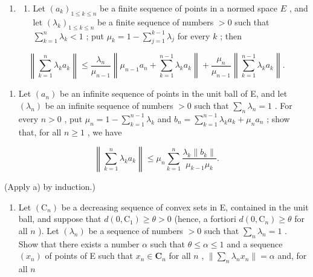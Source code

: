\begin{enumerate}
\def\labelenumi{\arabic{enumi})}
\setcounter{enumi}{23}
\tightlist
\item
  \begin{enumerate}
  \def\labelenumii{\alph{enumii})}
  \tightlist
  \item
    Let \((a_{k})_{1\leqslant k\leqslant n}\) be a finite sequence of points in a normed space \(E\) , and let \((\lambda_k)_{1\leqslant k\leqslant n}\) be a finite sequence of numbers \(>0\) such that \(\sum_{k = 1}^{n}\lambda_{k} < 1\) ; put \(\mu_{k} = 1 - \sum_{j = 1}^{k - 1}\lambda_{j}\) for every \(k\) ; then
  \end{enumerate}
\end{enumerate}

\[
\left\| \sum_ {k = 1} ^ {n} \lambda_ {k} a _ {k} \right\| \leqslant \frac {\lambda_ {n}}{\mu_ {n - 1}} \left\| \mu_ {n - 1} a _ {n} + \sum_ {k = 1} ^ {n - 1} \lambda_ {k} a _ {k} \right\| + \frac {\mu_ {n}}{\mu_ {n - 1}} \left\| \sum_ {k = 1} ^ {n - 1} \lambda_ {k} a _ {k} \right\|.
\]

\begin{enumerate}
\def\labelenumi{\alph{enumi})}
\setcounter{enumi}{1}
\tightlist
\item
  Let \((a_{n})\) be an infinite sequence of points in the unit ball of E, and let \((\lambda_{n})\) be an infinite sequence of numbers \(>0\) such that \(\sum_{n} \lambda_{n} = 1\) . For every \(n > 0\) , put \(\mu_{n} = 1 - \sum_{k=1}^{n-1} \lambda_{k}\) and \(b_{n} = \sum_{k=1}^{n-1} \lambda_{k} a_{k} + \mu_{n} a_{n}\) ; show that, for all \(n \geqslant 1\) , we have
\end{enumerate}

\[
\left\| \sum_ {k = 1} ^ {n} \lambda_ {k} a _ {k} \right\| \leqslant \mu_ {n} \sum_ {k = 1} ^ {n} \frac {\lambda_ {k} \| b _ {k} \|}{\mu_ {k - 1} \mu_ {k}}.
\]

(Apply a) by induction.)

\begin{enumerate}
\def\labelenumi{\alph{enumi})}
\setcounter{enumi}{2}
\tightlist
\item
  Let \((\mathrm{C}_n)\) be a decreasing sequence of convex sets in E, contained in the unit ball, and suppose that \(d(0,\mathrm{C}_1)\geqslant \theta >0\) (hence, a fortiori \(d(0,\mathrm{C}_n)\geqslant \theta\) for all \(n\) ). Let \((\lambda_{n})\) be a sequence of numbers \(>0\) such that \(\sum_{n}\lambda_{n} = 1\) . Show that there exists a number \(\alpha\) such that \(\theta \leqslant \alpha \leqslant 1\) and a sequence \((x_{n})\) of points of E such that \(x_{n}\in \mathbf{C}_{n}\) for all \(n\) , \(\| \sum_{n}\lambda_{n}x_{n}\| = \alpha\) and, for all \(n\)
\end{enumerate}

